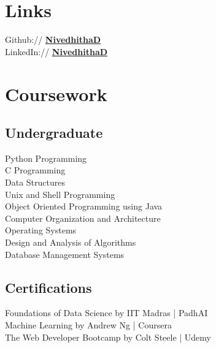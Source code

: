 \documentclass[]{deedy-resume-openfont}
\begin{document}
\begin{minipage}[t]{0.33\textwidth}

\section{Links}
Github:// \href{https://github.com/nive927}{\bf NivedhithaD} \\
LinkedIn://  \href{https://www.linkedin.com/in/nivedhitha-d-0bb67b1b0}{\bf NivedhithaD} \\


\section{Coursework}
\subsection{Undergraduate}
Python Programming \\
C Programming \\
Data Structures \\
Unix and Shell Programming \\
Object Oriented Programming using Java \\
Computer Organization and Architecture \\
Operating Systems \\
Design and Analysis of Algorithms \\
Database Management Systems \\
\sectionsep

\subsection{Certifications}
Foundations of Data Science by IIT Madras | PadhAI \\
Machine Learning by Andrew Ng | Coursera \\
The Web Developer Bootcamp by Colt Steele | Udemy \\


%
%

\end{minipage} 
\hfill
\end{document}
